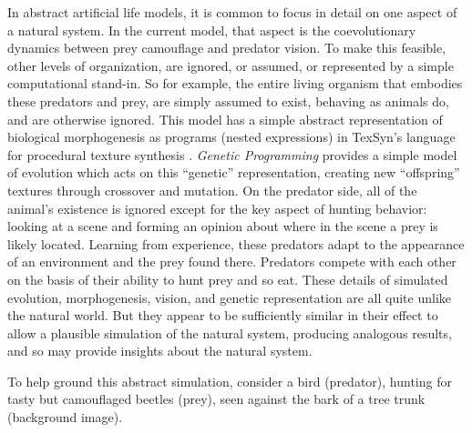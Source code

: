 \documentclass[letterpaper]{article}
\newcommand{\jargon}[1]{\textit{#1}}
\newcommand{\texsyn}[0]{TexSyn}
\begin{document}
In abstract artificial life models, it is common to focus in detail on one aspect of a natural system. In the current model, that aspect is the coevolutionary dynamics between prey camouflage and predator vision. To make this feasible, other levels of organization, are ignored, or assumed, or represented by a simple computational stand-in. So for example, the entire living organism that embodies these predators and prey, are simply assumed to exist, behaving as animals do, and are otherwise ignored. This model has a simple abstract representation of biological morphogenesis as programs (nested expressions) in \texsyn{}'s language for procedural texture synthesis \citep{reynolds_texsyn_2019}. \jargon{Genetic Programming} provides a simple model of evolution which acts on this “genetic” representation, creating new “offspring” textures through crossover and mutation. On the predator side, all of the animal's existence is ignored except for the key aspect of hunting behavior: looking at a scene and forming an opinion about where in the scene a prey is likely located. Learning from experience, these predators adapt to the appearance of an environment and the prey found there. Predators compete with each other on the basis of their ability to hunt prey and so eat. These details of simulated evolution, morphogenesis, vision, and genetic representation are all quite unlike the natural world. But they appear to be sufficiently similar in their effect to allow a plausible simulation of the natural system, producing analogous results, and so may provide insights about the natural system.
\par
To help ground this abstract simulation, consider a bird (predator), hunting for tasty but camouflaged beetles (prey), seen against the bark of a tree trunk (background image).
\par

\end{document}
